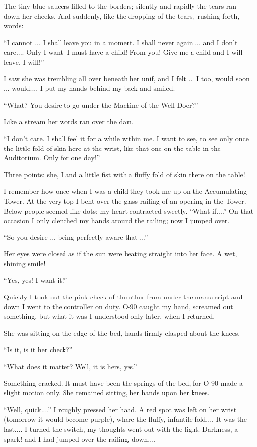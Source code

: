 \documentclass[11pt,openany]{book}
\begin{document}
The tiny blue saucers filled to the borders; silently and rapidly the tears ran down her cheeks. And suddenly, like the dropping of the tears,--rushing forth,--words:

``I cannot ... I shall leave you in a moment. I shall never again ... and I don't care.... Only I want, I must have a child! From you! Give me a child and I will leave. I will!''

I saw she was trembling all over beneath her unif, and I felt ... I too, would soon ... would.... I put my hands behind my back and smiled.

``What? You desire to go under the Machine of the Well-Doer?''

Like a stream her words ran over the dam.

``I don't care. I shall feel it for a while within me. I want to see, to see only once the little fold of skin here at the wrist, like that one on the table in the Auditorium. Only for one day!''

Three points: she, I and a little fist with a fluffy fold of skin there on the table!

I remember how once when I was a child they took me up on the Accumulating Tower. At the very top I bent over the glass railing of an opening in the Tower. Below people seemed like dots; my heart contracted sweetly. ``What if....'' On that occasion I only clenched my hands around the railing; now I jumped over.

``So you desire ... being perfectly aware that ...''

Her eyes were closed as if the sun were beating straight into her face. A wet, shining smile!

``Yes, yes! I want it!''

Quickly I took out the pink check of the other from under the manuscript and down I went to the controller on duty. O-90 caught my hand, screamed out something, but what it was I understood only later, when I returned.

She was sitting on the edge of the bed, hands firmly clasped about the knees.

``Is it, is it her check?''

``What does it matter? Well, it is hers, yes.''

Something cracked. It must have been the springs of the bed, for O-90 made a slight motion only. She remained sitting, her hands upon her knees.

``Well, quick....'' I roughly pressed her hand. A red spot was left on her wrist (tomorrow it would become purple), where the fluffy, infantile fold.... It was the last.... I turned the switch, my thoughts went out with the light. Darkness, a spark! and I had jumped over the railing, down....
\end{document}
